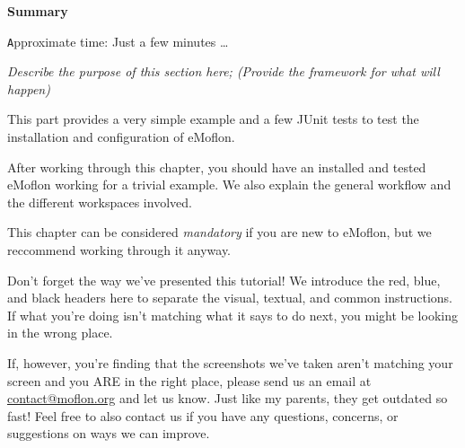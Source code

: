 \vspace*{2cm}

{\Huge \bfseries Summary}
\vspace{0.5cm}

{\small \texttt Approximate time: Just a few minutes \ldots}

\emph{Describe the purpose of this section here; (Provide the framework for what will happen)}

This part provides a very simple example and a few JUnit tests to test the installation and configuration of eMoflon.

After working through this chapter, you should have an installed and tested eMoflon working for a trivial example.
We also explain the general workflow and the different workspaces involved.

This chapter can be considered \emph{mandatory} if you are new to eMoflon, but we reccommend working through it anyway.

Don't forget the way we've presented this tutorial! We introduce the red, blue, and black headers here to separate the visual, textual, and common instructions. 
If what you're doing isn't matching what it says to do next, you might be looking in the wrong place.

If, however, you're finding that the screenshots we've taken aren't matching your screen and you ARE in the right place, please send us an email at \href{mailto:contact@moflon.org}{contact@moflon.org} and let us know. Just like my parents, they get outdated so fast! Feel free to also contact us if you have any questions, concerns, or suggestions on ways we can improve.